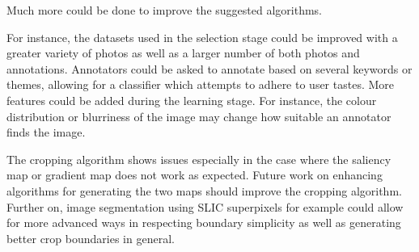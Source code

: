 Much more could be done to improve the suggested algorithms.

For instance, the datasets used in the selection stage could be improved with a
greater variety of photos as well as a larger number of both photos and
annotations.
Annotators could be asked to annotate based on several keywords or themes,
allowing for a classifier which attempts to adhere to user tastes.
More features could be added during the learning stage.
For instance, the colour distribution or blurriness of the image may change how
suitable an annotator finds the image.

The cropping algorithm shows issues especially in the case where the saliency
map or gradient map does not work as expected.
Future work on enhancing algorithms for generating the two maps should improve
the cropping algorithm.
Further on, image segmentation using SLIC superpixels for example could allow
for more advanced ways in respecting boundary simplicity as well as generating
better crop boundaries in general.

